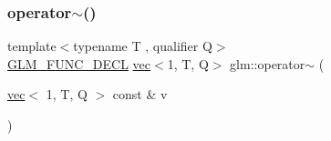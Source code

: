 \subsubsection{\texorpdfstring{operator$\sim$()}{operator~()}}
{\footnotesize\ttfamily template$<$typename T , qualifier Q$>$ \\
\hyperlink{setup_8hpp_ab2d052de21a70539923e9bcbf6e83a51}{G\+L\+M\+\_\+\+F\+U\+N\+C\+\_\+\+D\+E\+CL} \hyperlink{structglm_1_1vec}{vec}$<$1, T, Q$>$ glm\+::operator$\sim$ (\begin{DoxyParamCaption}\item[{\hyperlink{structglm_1_1vec}{vec}$<$ 1, T, Q $>$ const \&}]{v }\end{DoxyParamCaption})}

